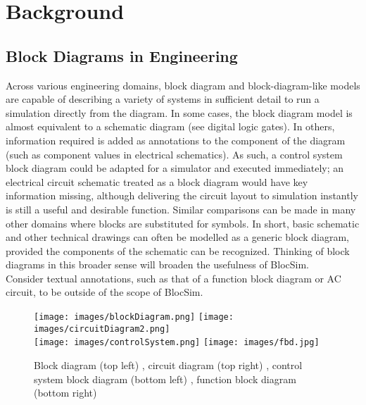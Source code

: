 \begin{comment}

\end{comment}


\chapter{Background}
\label{ch:back}

\section{Block Diagrams in Engineering}


Across various engineering domains, block diagram and block-diagram-like models are capable of describing a variety of systems in sufficient detail to run a simulation directly from the diagram. In some cases, the block diagram model is almost equivalent to a schematic diagram (see digital logic gates). In others, information required is added as annotations to the component of the diagram (such as component values in electrical schematics). As such, a control system block diagram could be adapted for a simulator and executed immediately; an electrical circuit schematic treated as a block diagram would have key information missing, although delivering the circuit layout to simulation instantly is still a useful and desirable function. Similar comparisons can be made in many other domains where blocks are substituted for symbols. In short, basic schematic and other technical drawings can often be modelled as a generic block diagram, provided the components of the schematic can be recognized. Thinking of block diagrams in this broader sense will broaden the usefulness of BlocSim.
\\


Consider textual annotations, such as that of a function block diagram or AC circuit, to be outside of the scope of BlocSim.

\begin{figure}[ht!]
\texttt{[image: images/blockDiagram.png]}
\hspace{0.5 cm}
\texttt{[image: images/circuitDiagram2.png]} \\
\texttt{[image: images/controlSystem.png]} 
\hspace{0.5 cm}
\texttt{[image: images/fbd.jpg]} 
\centering
\caption{Block diagram (top left) \cite{wiringDiagrams}, circuit diagram (top right) \cite{engineeronadisk}, control system block diagram (bottom left) \cite{engineeronadisk}, function block diagram (bottom right) \cite{wikicommonsFbd}}
\label{im:blockExample}
\end{figure}

